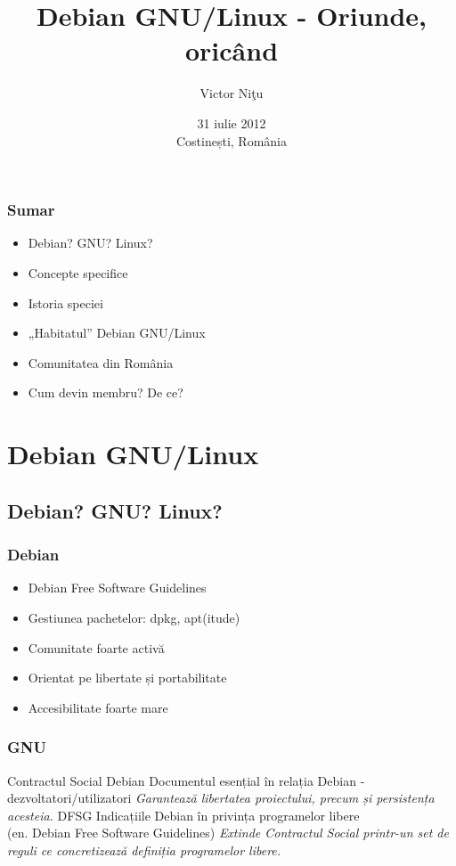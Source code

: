 \documentclass[xcolor=dvipsnames]{beamer}
\title[Debian GNU/Linux - Oriunde, oricând]{Debian GNU/Linux - Oriunde, oricând}
\author{Victor Ni\c{t}u}
\institute[Fundația Ceata, Debian România]
{
Fundația Ceata\\Comunitatea Debian din Rom\^{a}nia\\
\medskip
{\emph{victor@debian.org.ro}}
}
\date{31 iulie 2012\\Costinești, România}
\begin{document}
%
\begin{frame}
\titlepage
\end{frame}
%
\begin{frame}
\frametitle{Sumar}
\begin{itemize}
\item Debian? GNU? Linux?
\item Concepte specifice
\item Istoria speciei
\item „Habitatul” Debian GNU/Linux
\item Comunitatea din România
\item Cum devin membru? De ce?
\end{itemize}
\end{frame}
%
\section{Debian GNU/Linux}
\subsection{Debian? GNU? Linux?}
\begin{frame}
\frametitle{Debian}
\begin{block}{}
\begin{itemize}
\item Debian Free Software Guidelines
\item Gestiunea pachetelor: dpkg, apt(itude)
\item Comunitate foarte activă
\item Orientat pe libertate și portabilitate
\item Accesibilitate foarte mare
\end{itemize}
\end{block}
\end{frame}

\begin{frame}
\frametitle{GNU}
\footnotesize{
\begin{thebibliography}{99}
  Contractul Social Debian
 \newblock Documentul esențial în relația Debian - dezvoltatori/utilizatori
 \newblock \emph{Garantează libertatea proiectului, precum și persistența acesteia.}
  DFSG
 \newblock Indicațiile Debian în privința programelor libere \\
 (en. Debian Free Software Guidelines)
 \newblock \emph{Extinde Contractul Social printr-un set de reguli ce concretizează definiția programelor libere.}
\end{thebibliography}
}
\end{frame}
\end{document}
